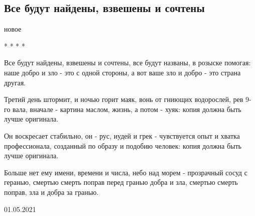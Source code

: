  
 
 
 
 

\subsection{Все будут найдены, взвешены и сочтены}
\label{sec:01_05_2021.fb.kabanov_aleksandr.1.stih}

новое

* * * *

Все будут найдены, взвешены и сочтены,
все будут названы, в розыске помогая:
наше добро и зло - это с одной стороны,
а вот ваше зло и добро - это страна другая.

Третий день штормит, и ночью горит маяк,
вонь от гниющих водорослей, рев 9-го вала,
вначале - картина маслом, жизнь, а потом - хуяк:
копия должна быть лучше оригинала.

Он воскресает стабильно, он - рус, иудей и грек -
чувствуется опыт и хватка профессионала,
созданный по образу и подобию человек:
копия должна быть лучше оригинала.

Больше нет ему имени, времени и числа,
небо над морем - прозрачный сосуд с геранью,
смертью смерть поправ перед гранью добра и зла,
смертью смерть поправ, зла и добра за гранью.

01.05.2021
